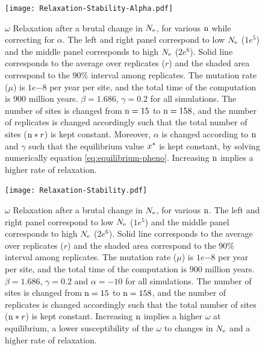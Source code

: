 \begin{figure}[H]
	\centering
	\texttt{[image: Relaxation-Stability-Alpha.pdf]}
	\caption[Relaxation time of $\omega$ dependence on $\Nsites$, while correction for $\alpha$]{
	$\omega$ Relaxation after a brutal change in $N_{\mathrm{e}}$, for various $\Nsites$ while correcting for $\alpha$.
	The left and right panel correspond to low $N_{\mathrm{e}}$ ($1e^{5}$) and the middle panel corresponds to high $N_{\mathrm{e}}$ ($2e^{6}$).
	Solid line corresponds to the average over replicates ($r$) and the shaded area correspond to the $90\%$ interval among replicates.
	The mutation rate ($\mu$) is $1e{-8}$ per year per site, and the total time of the computation is $900$ million years.
	$\beta=1.686$, $\gamma=0.2$ for all simulations. The number of sites is changed from $\text{n}=15$ to $\text{n}=158$, and the number of replicates is changed accordingly such that the total number of sites ($\text{n}*r$) is kept constant.
	Moreover, $\alpha$ is changed according to $\text{n}$ and $\gamma$ such that the equilibrium value $x^{*}$ is kept constant, by solving numerically equation \ref{eq:equilibrium-pheno}.
	Increasing $\text{n}$ implies a higher rate of relaxation.}
\end{figure}

\begin{figure}[H]
	\centering
	\texttt{[image: Relaxation-Stability.pdf]}
	\caption[Relaxation time of $\omega$ dependence on $\Nsites$]{
	$\omega$ Relaxation after a brutal change in $N_{\mathrm{e}}$, for various $\Nsites$.
	The left and right panel correspond to low $N_{\mathrm{e}}$ ($1e^{5}$) and the middle panel corresponds to high $N_{\mathrm{e}}$ ($2e^{6}$).
	Solid line corresponds to the average over replicates ($r$) and the shaded area correspond to the $90\%$ interval among replicates.
	The mutation rate ($\mu$) is $1e{-8}$ per year per site, and the total time of the computation is $900$ million years.
	$\beta=1.686$, $\gamma=0.2$ and $\alpha=-10$ for all simulations. The number of sites is changed from $\text{n}=15$ to $\text{n}=158$, and the number of replicates is changed accordingly such that the total number of sites ($\text{n}*r$) is kept constant.
	Increasing $\text{n}$ implies a higher $\omega$ at equilibrium, a lower susceptibility of the $\omega$ to changes in $N_{\mathrm{e}}$ and a higher rate of relaxation.
	}
\end{figure}

